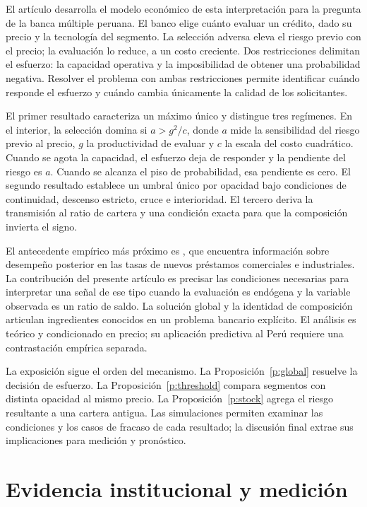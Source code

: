 \documentclass[11pt]{article}
\theoremstyle{definition}\newtheorem{assumption}{Supuesto}
\begin{document}
El artículo desarrolla el modelo económico de esta interpretación para la
pregunta de la banca múltiple peruana. El banco elige cuánto evaluar un
crédito, dado su precio y la tecnología del segmento. La selección adversa
eleva el riesgo previo con el precio; la evaluación lo reduce, a un costo
creciente. Dos restricciones delimitan el esfuerzo: la capacidad operativa y
la imposibilidad de obtener una probabilidad negativa. Resolver el problema
con ambas restricciones permite identificar cuándo responde el esfuerzo y
cuándo cambia únicamente la calidad de los solicitantes.

El primer resultado caracteriza un máximo único y distingue tres regímenes.
En el interior, la selección domina si $a>g^2/c$, donde $a$ mide la sensibilidad
del riesgo previo al precio, $g$ la productividad de evaluar y $c$ la escala
del costo cuadrático. Cuando se agota la capacidad, el esfuerzo deja de
responder y la pendiente del riesgo es $a$. Cuando se alcanza el piso de
probabilidad, esa pendiente es cero. El segundo resultado establece un
umbral único por opacidad bajo condiciones de continuidad, descenso estricto,
cruce e interioridad. El tercero deriva la transmisión al ratio de cartera y
una condición exacta para que la composición invierta el signo.

El antecedente empírico más próximo es \citet{morgan2003}, que encuentra
información sobre desempeño posterior en las tasas de nuevos préstamos
comerciales e industriales. La contribución del presente artículo es precisar
las condiciones necesarias para interpretar una señal de ese tipo cuando la
evaluación es endógena y la variable observada es un ratio de saldo. La
solución global y la identidad de composición articulan ingredientes conocidos
en un problema bancario explícito. El análisis es teórico y condicionado en
precio; su aplicación predictiva al Perú requiere una contrastación empírica
separada.

La exposición sigue el orden del mecanismo. La Proposición~\ref{p:global}
resuelve la decisión de esfuerzo. La Proposición~\ref{p:threshold} compara
segmentos con distinta opacidad al mismo precio. La Proposición~\ref{p:stock}
agrega el riesgo resultante a una cartera antigua. Las simulaciones permiten
examinar las condiciones y los casos de fracaso de cada resultado; la
discusión final extrae sus implicaciones para medición y pronóstico.

\section{Evidencia institucional y medición}
\end{document}
